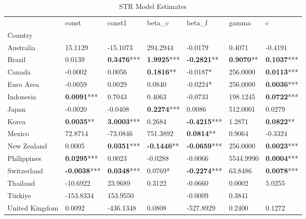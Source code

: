 \begin{table}
\caption{STR Model Estimates}
\label{tab:str_results}
\begin{tabular}{lllllll}
\toprule
 & const & const1 & beta_c & beta_f & gamma & c \\
Country &  &  &  &  &  &  \\
\midrule
Australia & 15.1129 & -15.1073 & 294.2944 & -0.0179 & 0.4071 & -0.4191 \\
Brazil & 0.0139 & \textbf{0.3476}*** & \textbf{1.9925}*** & \textbf{-0.2821}** & \textbf{0.9070}** & \textbf{0.1037}*** \\
Canada & -0.0002 & 0.0056 & \textbf{0.1816}** & -0.0187* & 256.0000 & \textbf{0.0113}*** \\
Euro Area & -0.0059 & 0.0029 & 0.0840 & -0.0224* & 256.0000 & \textbf{0.0036}*** \\
Indonesia & \textbf{0.0091}*** & 0.7043 & 0.4063 & -0.0733 & 198.1245 & \textbf{0.0722}*** \\
Japan & -0.0020 & -0.0408 & \textbf{0.2274}*** & 0.0086 & 512.0001 & 0.0279 \\
Korea & \textbf{0.0035}** & \textbf{3.0003}*** & 0.2684 & \textbf{-0.4215}*** & 1.2871 & \textbf{0.0822}** \\
Mexico & 72.8714 & -73.0846 & 751.3892 & \textbf{0.0814}** & 0.9064 & -0.3324 \\
New Zealand & 0.0005 & \textbf{0.0351}*** & \textbf{-0.1446}** & \textbf{-0.0659}*** & 256.0000 & \textbf{0.0023}*** \\
Philippines & \textbf{0.0295}*** & 0.0023 & -0.0288 & -0.0066 & 5544.9990 & \textbf{0.0004}*** \\
Switzerland & \textbf{-0.0038}*** & \textbf{0.0348}*** & 0.0769* & \textbf{-0.2274}*** & 63.8486 & \textbf{0.0078}*** \\
Thailand & -10.6922 & 23.9689 & 0.3122 & -0.0660 & 0.0002 & 5.0255 \\
Türkiye & -153.8334 & 153.9550 &  & -0.0009 & 0.3841 &  \\
United Kingdom & 0.0092 & -436.1348 & 0.0808 & -527.8929 & 0.2400 & 0.1272 \\
\bottomrule
\end{tabular}
\end{table}
